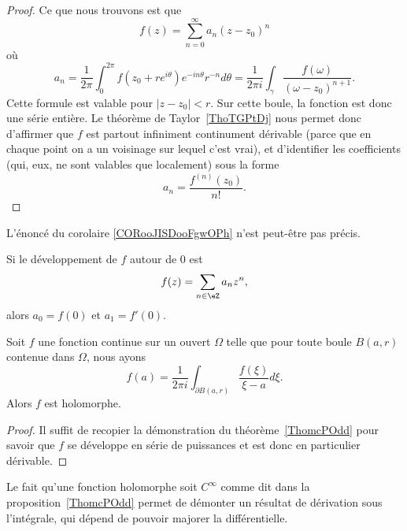 \begin{proof}
	Ce que nous trouvons est que
	\begin{equation}
		f(z)=\sum_{n=0}^{\infty}a_n(z-z_0)^n
	\end{equation}
	où
	\begin{equation}
		a_n=\frac{1}{ 2\pi }\int_0^{2\pi}f(z_0+r e^{i\theta}) e^{-in\theta}r^{-n}d\theta=\frac{1}{ 2\pi i }\int_{\gamma}\frac{ f(\omega) }{ (\omega-z_0)^{n+1} }.
	\end{equation}
	Cette formule est valable pour \( | z-z_0 |<r\). Sur cette boule, la fonction est donc une série entière. Le théorème de Taylor~\ref{ThoTGPtDj} nous permet donc d'affirmer que \( f\) est partout infiniment continument dérivable (parce que en chaque point on a un voisinage sur lequel c'est vrai), et d'identifier les coefficients (qui, eux, ne sont valables que localement) sous la forme
	\begin{equation}
		a_n=\frac{ f^{(n)}(z_0) }{ n! }.
	\end{equation}
\end{proof}


\begin{probleme}
	L'énoncé du corolaire \ref{CORooJISDooFgwOPh} n'est peut-être pas précis.
\end{probleme}

\begin{corollary}       \label{CORooJISDooFgwOPh}
	Si le développement de \( f\) autour de \( 0\) est
	\begin{equation}
		f(z)=\sum_{n\in \eZ}a_nz^n,
	\end{equation}
	alors \( a_0=f(0)\) et \( a_1=f'(0)\).
\end{corollary}

\begin{corollary}       \label{CorwfHtJu}
	Soit \( f\) une fonction continue sur un ouvert \( \Omega\) telle que pour toute boule \( B(a,r)\) contenue dans \( \Omega\), nous ayons
	\begin{equation}
		f(a)=\frac{1}{ 2\pi i }\int_{\partial B(a,r)}\frac{ f(\xi) }{ \xi-a }d\xi.
	\end{equation}
	Alors \( f\) est holomorphe.
\end{corollary}

\begin{proof}
	Il suffit de recopier la démonstration du théorème~\ref{ThomcPOdd} pour savoir que \( f\) se développe en série de puissances et est donc en particulier dérivable.
\end{proof}

Le fait qu'une fonction holomorphe soit \(  C^{\infty}\) comme dit dans la proposition~\ref{ThomcPOdd} permet de démonter un résultat de dérivation sous l'intégrale, qui dépend de pouvoir majorer la différentielle.

